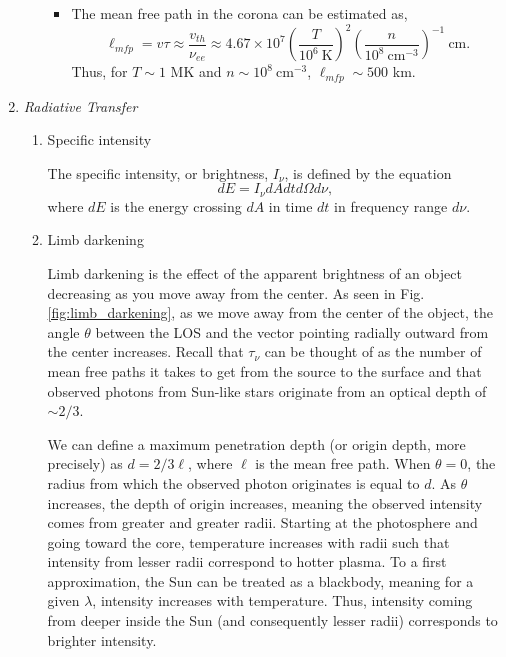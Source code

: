 \begin{enumerate}
\begin{enumerate}
\begin{itemize}
					\item The mean free path in the corona can be estimated as,
					\begin{equation}
						\ell_{mfp}=v\tau\approx \frac{v_{th}}{\nu_{ee}}\approx 4.67\times10^{7}\left(\frac{T}{10^6~\mathrm{K}}\right)^2\left(\frac{n}{10^8~\mathrm{cm}^{-3}}\right)^{-1}~\mathrm{cm}.
					\end{equation}
					Thus, for $T\sim1$ MK and $n\sim10^8~\mathrm{cm}^{-3}$, $\ell_{mfp}\sim500$ km. 
				\end{itemize}
			\end{enumerate}
			\item{\em Radiative Transfer}
			\begin{enumerate}
				\item{Specific intensity}
				\par The specific intensity, or brightness, $I_{\nu}$, is defined by the equation
				\begin{equation}
					\label{eq:spec_intensity}
					dE=I_{\nu}dAdtd\Omega d\nu,
				\end{equation}
				where $dE$ is the energy crossing $dA$ in time $dt$ in frequency range $d\nu$. 
				\item{Limb darkening}
				\par Limb darkening is the effect of the apparent brightness of an object decreasing as you move away from the center. As seen in Fig. \ref{fig:limb_darkening}, as we move away from the center of the object, the angle $\theta$ between the LOS and the vector pointing radially outward from the center increases. Recall that $\tau_{\nu}$ can be thought of as the number of mean free paths it takes to get from the source to the surface and that observed photons from Sun-like stars originate from an optical depth of $\sim2/3$. 
				\par We can define a maximum penetration depth (or origin depth, more precisely) as $d=2/3\ell$, where $\ell$ is the mean free path. When $\theta=0$, the radius from which the observed photon originates is equal to $d$. As $\theta$ increases, the depth of origin increases, meaning the observed intensity comes from greater and greater radii. Starting at the photosphere and going toward the core, temperature increases with radii such that intensity from lesser radii correspond to hotter plasma. To a first approximation, the Sun can be treated as a blackbody, meaning for a given $\lambda$, intensity increases with temperature. Thus, intensity coming from deeper inside the Sun (and consequently lesser radii) corresponds to brighter intensity. 

\end{enumerate}
\end{enumerate}
